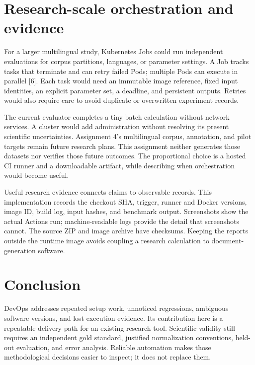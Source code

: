 \newpage
\section{Research-scale orchestration and evidence}
For a larger multilingual study, Kubernetes Jobs could run independent evaluations for corpus partitions, languages, or parameter settings. A Job tracks tasks that terminate and can retry failed Pods; multiple Pods can execute in parallel [6]. Each task would need an immutable image reference, fixed input identities, an explicit parameter set, a deadline, and persistent outputs. Retries would also require care to avoid duplicate or overwritten experiment records.

The current evaluator completes a tiny batch calculation without network services. A cluster would add administration without resolving its present scientific uncertainties. Assignment 4's multilingual corpus, annotation, and pilot targets remain future research plans. This assignment neither generates those datasets nor verifies those future outcomes. The proportional choice is a hosted CI runner and a downloadable artifact, while describing when orchestration would become useful.

Useful research evidence connects claims to observable records. This implementation records the checkout SHA, trigger, runner and Docker versions, image ID, build log, input hashes, and benchmark output. Screenshots show the actual Actions run; machine-readable logs provide the detail that screenshots cannot. The source ZIP and image archive have checksums. Keeping the reports outside the runtime image avoids coupling a research calculation to document-generation software.

\section{Conclusion}
DevOps addresses repeated setup work, unnoticed regressions, ambiguous software versions, and lost execution evidence. Its contribution here is a repeatable delivery path for an existing research tool. Scientific validity still requires an independent gold standard, justified normalization conventions, held-out evaluation, and error analysis. Reliable automation makes those methodological decisions easier to inspect; it does not replace them.

